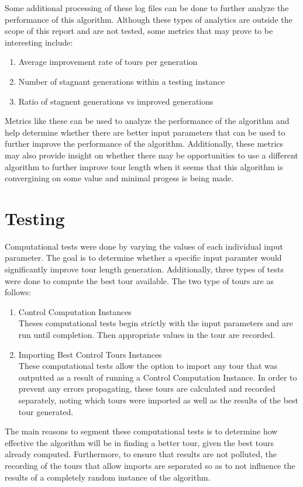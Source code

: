 \documentclass[12pt]{article}
\begin{document}
Some additional processing of these log files can be done to further analyze the performance of this algorithm. Although these types of analytics are outside the scope of this report and are not tested, some metrics that may prove to be interesting include:
\begin{enumerate}
  \item Average improvement rate of tours per generation
  \item Number of stagnant generations within a testing instance
  \item Ratio of stagnent generations vs improved generations
\end{enumerate}

Metrics like these can be used to analyze the performance of the algorithm and help determine whether there are better input parameters that can be used to further improve the performance of the algorithm. Additionally, these metrics may also provide insight on whether there may be opportunities to use a different algorithm to further improve tour length when it seems that this algorithm is convergining on some value and minimal progess is being made.\\

\section{Testing}

Computational tests were done by varying the values of each individual input parameter. The goal is to determine whether a specific input paramter would significantly improve tour length generation. Additionally, three types of tests were done to compute the best tour available. The two type of tours are as follows:
\begin{enumerate}
  \item Control Computation Instances\\

  Theses computational tests begin strictly with the input parameters and are run until completion. Then appropriate values in the tour are recorded.

  \item Importing Best Control Tours Instances\\

  These computational tests allow the option to import any tour that was outputted as a result of running a Control Computation Instance. In order to prevent any errors propagating, these tours are calculated and recorded separately, noting which tours were imported as well as the results of the best tour generated.

\end{enumerate}

The main reasons to segment these computational tests is to determine how effective the algorithm will be in finding a better tour, given the best tours already computed. Furthermore, to ensure that results are not polluted, the recording of the tours that allow imports are separated so as to not influence the results of a completely random instance of the algorithm.
\end{document}
